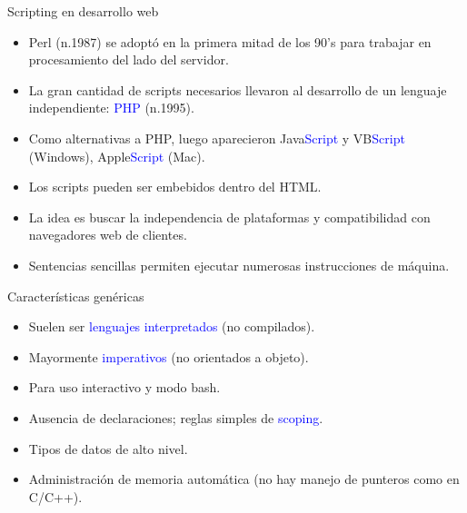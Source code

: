 \documentclass[handout]{beamer} %
\newcommand{\blue}[1]{\textcolor{blue}{#1}}
\begin{document}
\begin{frame}{Scripting en desarrollo web}
  \begin{itemize}
    \item<1-> Perl (n.1987) se adoptó en la primera mitad de los 90's para trabajar en procesamiento del lado del servidor.
    \item<2-> La gran cantidad de scripts necesarios llevaron al desarrollo de un lenguaje independiente: \blue{PHP} (n.1995).
    \item<3-> Como alternativas a PHP, luego aparecieron Java\blue{Script} y VB\blue{Script} (Windows), Apple\blue{Script} (Mac).
    \item<4-> Los scripts pueden ser embebidos dentro del HTML.
    \item<5-> La idea es buscar la independencia de plataformas y compatibilidad con navegadores web de clientes.
    \item<6-> Sentencias sencillas permiten ejecutar numerosas instrucciones de máquina.
  \end{itemize}
\end{frame}

\begin{frame}{Características genéricas}
  \begin{itemize}
    \item Suelen ser \blue{lenguajes interpretados} (no compilados).
    \item Mayormente \blue{imperativos} (no orientados a objeto).
    \item Para uso interactivo y modo bash.
    \item Ausencia de declaraciones; reglas simples de \blue{scoping}.
    \item Tipos de datos de alto nivel.
    \item Administración de memoria automática (no hay manejo de punteros como en C/C++).
  \end{itemize}
\end{frame}
\end{document}
